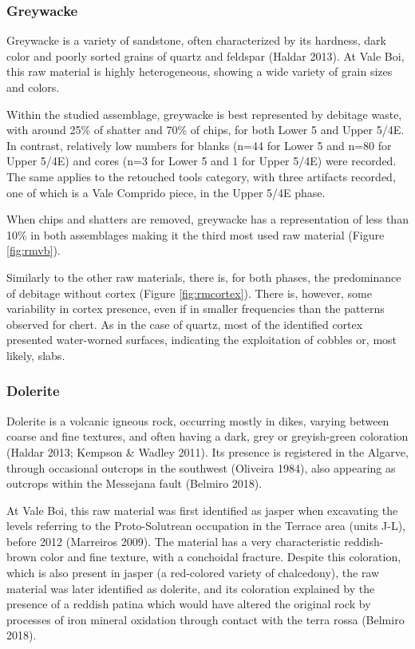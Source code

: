 \documentclass[12pt,twoside]{reedthesis}
\begin{document}
\hypertarget{greywacke}{%
\subsubsection{Greywacke}\label{greywacke}}

Greywacke is a variety of sandstone, often characterized by its hardness, dark color and poorly sorted grains of quartz and feldspar (Haldar 2013). At Vale Boi, this raw material is highly heterogeneous, showing a wide variety of grain sizes and colors.

Within the studied assemblage, greywacke is best represented by debitage waste, with around 25\% of shatter and 70\% of chips, for both Lower 5 and Upper 5/4E. In contrast, relatively low numbers for blanks (n=44 for Lower 5 and n=80 for Upper 5/4E) and cores (n=3 for Lower 5 and 1 for Upper 5/4E) were recorded. The same applies to the retouched tools category, with three artifacts recorded, one of which is a Vale Comprido piece, in the Upper 5/4E phase.

When chips and shatters are removed, greywacke has a representation of less than 10\% in both assemblages making it the third most used raw material (Figure \ref{fig:rmvb}).

Similarly to the other raw materials, there is, for both phases, the predominance of debitage without cortex (Figure \ref{fig:rmcortex}). There is, however, some variability in cortex presence, even if in smaller frequencies than the patterns observed for chert. As in the case of quartz, most of the identified cortex presented water-worned surfaces, indicating the exploitation of cobbles or, most likely, slabs.

\hypertarget{dolerite}{%
\subsubsection{Dolerite}\label{dolerite}}

Dolerite is a volcanic igneous rock, occurring mostly in dikes, varying between coarse and fine textures, and often having a dark, grey or greyish-green coloration (Haldar 2013; Kempson \& Wadley 2011). Its presence is registered in the Algarve, through occasional outcrops in the southwest (Oliveira 1984), also appearing as outcrops within the Messejana fault (Belmiro 2018).

At Vale Boi, this raw material was first identified as jasper when excavating the levels referring to the Proto-Solutrean occupation in the Terrace area (units J-L), before 2012 (Marreiros 2009). The material has a very characteristic reddish-brown color and fine texture, with a conchoidal fracture. Despite this coloration, which is also present in jasper (a red-colored variety of chalcedony), the raw material was later identified as dolerite, and its coloration explained by the presence of a reddish patina which would have altered the original rock by processes of iron mineral oxidation through contact with the terra rossa (Belmiro 2018).
\end{document}
